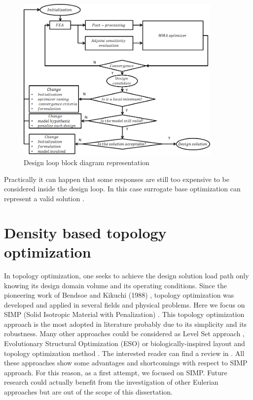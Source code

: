 \begin{figure}[ht]
\centering
\includegraphics[width=10cm]{images/Ch2/design_loop}
\caption{Design loop block diagram representation}
\label{fig.2.8}
\end{figure}
Practically it can happen that some responses are still too expensive to be considered inside the design loop. In this case surrogate base optimization can represent a valid solution \cite{forrester2008engineering}.
\section{Density based topology optimization}
\label{sec:2.2}
In topology optimization, one seeks to achieve the design solution load path only knowing its design domain volume and its operating conditions. Since the pioneering work of Bendsoe and Kikuchi (1988) \cite{bendsoe1988generating}, topology optimization was developed and applied in several fields and physical problems. Here we focus on SIMP (Solid Isotropic Material with Penalization) \cite{bendsoe1989optimal}. This topology optimization approach is the most adopted in literature \cite{deaton2014survey} probably due to its simplicity and its robustness. Many other approaches could be considered as Level Set approach \cite{wang2003level}, Evolutionary Structural Optimization (ESO) \cite{xie1993simple} or biologically-inspired layout and topology optimization method \cite{kobayashi2010biologically}. The interested reader can find a review in \cite{deaton2014survey}. All these approaches show some advantages and shortcomings with respect to SIMP approach. For this reason, as a first attempt, we focused on SIMP. Future research could actually benefit from the investigation of other Eulerian approaches but are out of the scope of this dissertation.  

